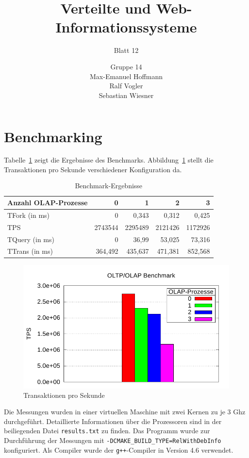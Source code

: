 \documentclass[11pt,a4paper]{scrartcl}
\begin{document}
\author{Gruppe 14\\Max-Emanuel Hoffmann\\Ralf Vogler\\Sebastian Wiesner}
\title{Verteilte und Web-Informationssysteme}
\subtitle{Blatt 12}

\maketitle

\setcounter{section}{1}

\section{Benchmarking}

Tabelle~\ref{tab:results} zeigt die Ergebnisse des Benchmarks.
Abbildung~\ref{fig:tps} stellt die Transaktionen pro Sekunde verschiedener
Konfiguration da.

\begin{table}[h]
  \centering
  \begin{tabular}{l|r|r|r|r}
    \textbf{Anzahl OLAP-Prozesse} & \textbf{0} & \textbf{1} & \textbf{2} &
    \textbf{3} \\
    \hline
    TFork (in ms) & 0 & 0,343 & 0,312 & 0,425 \\
    TPS & 2743544 & 2295489 & 2121426 & 1172926 \\
    TQuery (in ms) & 0 & 36,99 & 53,025 & 73,316 \\
    TTrans (in ms) & 364,492 & 435,637 & 471,381 & 852,568 \\
  \end{tabular}
  \caption{Benchmark-Ergebnisse}
  \label{tab:results}
\end{table}

\begin{figure}[h]
  \centering
  \includegraphics[scale=.75]{TPS.pdf}
  \caption{Transaktionen pro Sekunde}
  \label{fig:tps}
\end{figure}

Die Messungen wurden in einer virtuellen Maschine mit zwei Kernen zu je 3 Ghz
durchgeführt.  Detaillierte Informationen über die Prozessoren sind in der
beiliegenden Datei \texttt{results.txt} zu finden.  Das Programm wurde zur
Durchführung der Messungen mit \texttt{-DCMAKE\_BUILD\_TYPE=RelWithDebInfo}
konfiguriert.  Als Compiler wurde der \texttt{g++}-Compiler in Version 4.6
verwendet.
\end{document}
